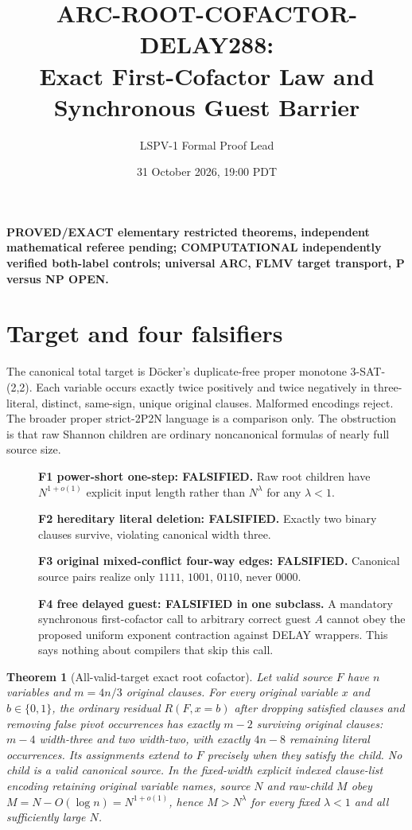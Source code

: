 \documentclass[10pt]{article}
\title{ARC-ROOT-COFACTOR-DELAY288:\\Exact First-Cofactor Law and Synchronous Guest Barrier}
\author{LSPV-1 Formal Proof Lead}
\date{31 October 2026, 19:00 PDT}
\newtheorem{theorem}{Theorem}
\begin{document}
\maketitle
\noindent\textbf{PROVED/EXACT elementary restricted theorems, independent mathematical referee pending; COMPUTATIONAL independently verified both-label controls; universal ARC, FLMV target transport, P versus NP OPEN.}
\section{Target and four falsifiers}
The canonical total target is D\"ocker's duplicate-free proper monotone 3-SAT-(2,2). Each variable occurs exactly twice positively and twice negatively in three-literal, distinct, same-sign, unique original clauses. Malformed encodings reject. The broader proper strict-2P2N language is a comparison only. The obstruction is that raw Shannon children are ordinary noncanonical formulas of nearly full source size.
\begin{description}
\item[] \textbf{F1 power-short one-step: FALSIFIED.} Raw root children have $N^{1+o(1)}$ explicit input length rather than $N^\lambda$ for any $\lambda<1$.
\item[] \textbf{F2 hereditary literal deletion: FALSIFIED.} Exactly two binary clauses survive, violating canonical width three.
\item[] \textbf{F3 original mixed-conflict four-way edges: FALSIFIED.} Canonical source pairs realize only $1111$, $1001$, $0110$, never $0000$.
\item[] \textbf{F4 free delayed guest: FALSIFIED in one subclass.} A mandatory synchronous first-cofactor call to arbitrary correct guest $A$ cannot obey the proposed uniform exponent contraction against DELAY wrappers. This says nothing about compilers that skip this call.
\end{description}
\begin{theorem}[All-valid-target exact root cofactor]
Let valid source $F$ have $n$ variables and $m=4n/3$ original clauses. For every original variable $x$ and $b\in\{0,1\}$, the ordinary residual $R(F,x=b)$ after dropping satisfied clauses and removing false pivot occurrences has exactly $m-2$ surviving original clauses: $m-4$ width-three and two width-two, with exactly $4n-8$ remaining literal occurrences. Its assignments extend to $F$ precisely when they satisfy the child. No child is a valid canonical source. In the fixed-width explicit indexed clause-list encoding retaining original variable names, source $N$ and raw-child $M$ obey $M=N-O(\log n)=N^{1+o(1)}$, hence $M>N^\lambda$ for every fixed $\lambda<1$ and all sufficiently large $N$.
\end{theorem}
\end{document}
